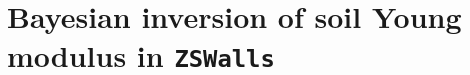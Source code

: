 \documentclass[dvipsnames]{beamer}
\begin{document}

	
	\section{Bayesian inversion of soil Young modulus in \texttt{ZSWalls}}
	
\end{document}
